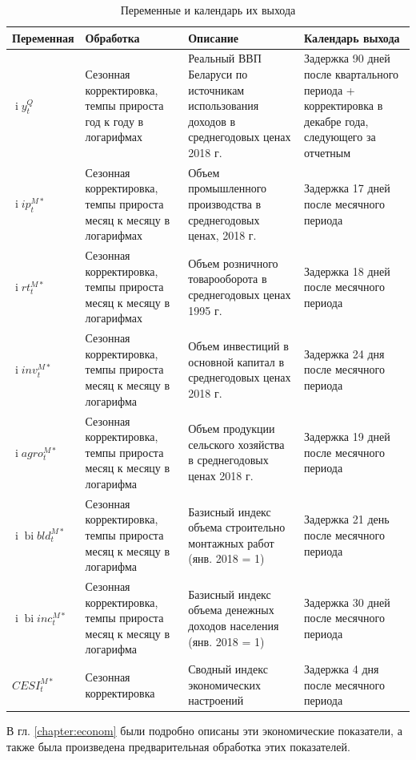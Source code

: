 \documentclass[a4paper, 14pt]{extreport}
\numberwithin{equation}{section}
\renewcommand{\i}{\operatorname{i}}
\newcommand{\bi}{\operatorname{bi}}
\numberwithin{equation}{section}
\begin{document}
	\begin{longtable}{|m{3cm}|m{4cm}|m{3cm}|m{5cm}|}
		\caption{Переменные и календарь их выхода}
		\label{tab:variables} \\ 
		\hline
		\textbf{Переменная} & \textbf{Обработка} & \textbf{Описание} & \textbf{Календарь выхода} \\ 
		\hline
		$\i y_t^{Q}$ & Сезонная корректировка, темпы прироста год к году в логарифмах & Реальный ВВП Беларуси по источникам использования доходов в среднегодовых ценах 2018 г. &
		Задержка 90 дней после квартального периода + корректировка в декабре года, следующего за отчетным \\ 
		\hline
		$\i ip_t^{M*}$ & Сезонная корректировка, темпы прироста месяц к месяцу в логарифмах & Объем промышленного производства в среднегодовых ценах, 2018 г. &
		Задержка 17 дней после месячного периода \\ 
		\hline
		$\i rt_t^{M*}$ & Сезонная корректировка, темпы прироста месяц к месяцу в логарифмах & Объем розничного товарооборота в среднегодовых ценах 1995 г. &
		Задержка 18 дней после месячного периода \\ 
		\hline
		$\i inv_t^{M*}$ & Сезонная корректировка, темпы прироста месяц к месяцу в логарифма & Объем инвестиций в основной капитал в среднегодовых ценах 2018 г. &
		Задержка 24 дня после месячного периода \\ 
		\hline
		$\i agro_t^{M*}$ & Сезонная корректировка, темпы прироста месяц к месяцу в логарифма & Объем продукции сельского хозяйства в среднегодовых ценах 2018 г. &
		Задержка 19 дней после месячного периода \\ 
		\hline
		$\i \bi bld_t^{M*}$ & Сезонная корректировка, темпы прироста месяц к месяцу в логарифма & Базисный индекс объема строительно монтажных работ (янв. 2018 = 1) &
		Задержка 21 день после месячного периода \\ 
		\hline
		$\i \bi inc_t^{M*}$ & Сезонная корректировка, темпы прироста месяц к месяцу в логарифма & Базисный индекс объема денежных доходов населения (янв. 2018 = 1) &
		Задержка 30 дней после месячного периода \\
		\hline
		$CESI_t^{M*}$ & Сезонная корректировка & Сводный индекс экономических настроений &
		Задержка 4 дня после месячного периода \\
		\hline
	\end{longtable}
	
	В гл. \ref{chapter:econom} были подробно описаны эти экономические показатели, а также была произведена предварительная обработка этих показателей. 
	
\end{document}
